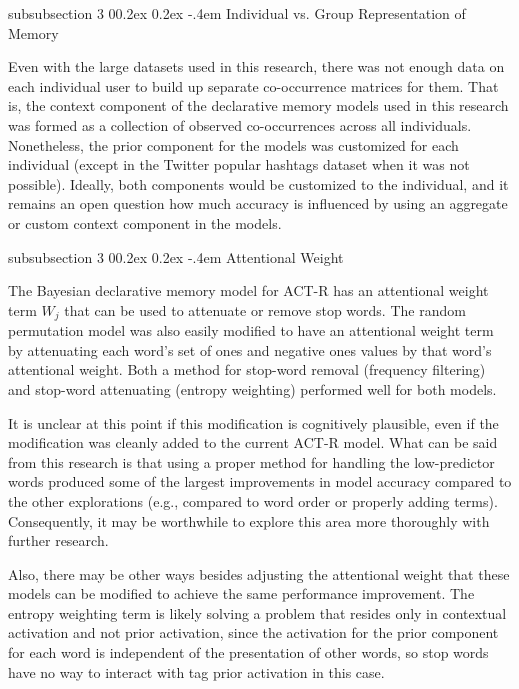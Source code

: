 \documentclass[man,floatsintext,donotrepeattitle]{apa6}
\makeatletter
\renewcommand{\subsubsection}{%
  \@startsection
  {subsubsection}%
  {3}%
  {\parindent}%
  {0\baselineskip \@plus 0.2ex \@minus 0.2ex}%
  {-.4em}%
  {\normalfont\normalsize\bfseries\addperi}}
\makeatother
\begin{document}
\subsubsection{Individual vs. Group Representation of Memory}

Even with the large datasets used in this research, there was not enough data on each individual user to build up separate co-occurrence matrices for them.
That is, the context component of the declarative memory models used in this research was formed as a collection of observed co-occurrences across all individuals.
Nonetheless, the prior component for the models was customized for each individual (except in the Twitter popular hashtags dataset when it was not possible).
Ideally, both components would be customized to the individual, and it remains an open question how much accuracy is influenced by using an aggregate or custom context component in the models.

\subsubsection{Attentional Weight}

The Bayesian declarative memory model for ACT-R has an attentional weight term $W_{j}$ that can be used to attenuate or remove stop words.
The random permutation model was also easily modified to have an attentional weight term by attenuating each word's set of ones and negative ones values by that word's attentional weight.
Both a method for stop-word removal (frequency filtering) and stop-word attenuating (entropy weighting) performed well for both models.

It is unclear at this point if this modification is cognitively plausible, even if the modification was cleanly added to the current ACT-R model.
What can be said from this research is that using a proper method for handling the low-predictor words produced some of the largest improvements in model accuracy compared to the other explorations
(e.g., compared to word order or properly adding terms).
Consequently, it may be worthwhile to explore this area more thoroughly with further research.

Also, there may be other ways besides adjusting the attentional weight that these models can be modified to achieve the same performance improvement.
The entropy weighting term is likely solving a problem that resides only in contextual activation and not prior activation,
since the activation for the prior component for each word is independent of the presentation of other words, so stop words have no way to interact with tag prior activation in this case.
\end{document}
